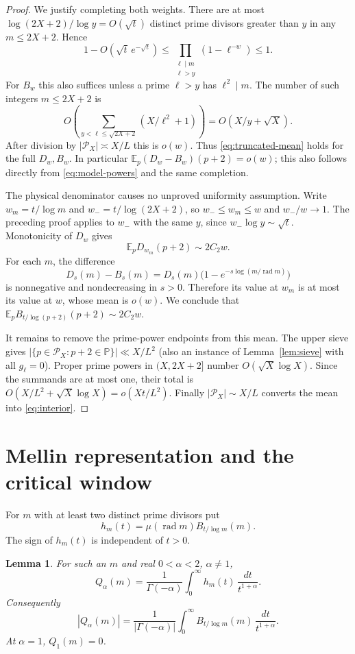 \documentclass[11pt]{article}
\newtheorem{lemma}[theorem]{Lemma}
\theoremstyle{remark}
\newcommand{\PP}{\mathbb P}
\newcommand{\E}{\mathbb E}
\newcommand{\rad}{\operatorname{rad}}
\begin{document}
\begin{proof}
We justify completing both weights. There are at most
$\log(2X+2)/\log y=O(\sqrt t)$ distinct prime divisors greater than
$y$ in any $m\le2X+2$. Hence
\[
 1-O(\sqrt t\,e^{-\sqrt t})
 \le\prod_{\substack{\ell\mid m\\\ell>y}}(1-\ell^{-w})\le1.
\]
For $B_w$ this also suffices unless a prime $\ell>y$ has
$\ell^2\mid m$. The number of such integers $m\le2X+2$ is
\[
 O\left(\sum_{y<\ell\le\sqrt{2X+2}}
                    (X/\ell^2+1)\right)
           =O(X/y+\sqrt X).
\]
After division by $|\mathcal P_X|\asymp X/L$ this is $o(w)$.
Thus \eqref{eq:truncated-mean} holds for the full $D_w,B_w$.
In particular $\E_p(D_w-B_w)(p+2)=o(w)$; this also follows directly
from \eqref{eq:model-powers} and the same completion.

The physical denominator causes no unproved uniformity assumption.
Write $w_m=t/\log m$ and $w_-=t/\log(2X+2)$, so
$w_-\le w_m\le w$ and $w_-/w\to1$. The preceding proof applies to
$w_-$ with the same $y$, since $w_-\log y\sim\sqrt t$.
Monotonicity of $D_w$ gives
\[
 \E_pD_{w_m}(p+2)\sim2C_2w.
\]
For each $m$, the difference
\[
 D_s(m)-B_s(m)=D_s(m)
          \bigl(1-e^{-s\log(m/\rad m)}\bigr)
\]
is nonnegative and nondecreasing in $s>0$. Therefore its value at
$w_m$ is at most its value at $w$, whose mean is $o(w)$.
We conclude that $\E_p B_{t/\log(p+2)}(p+2)\sim2C_2w$.

It remains to remove the prime-power endpoints from this mean.
The upper sieve gives $|\{p\in\mathcal P_X:p+2\in\PP\}|\ll X/L^2$
(also an instance of Lemma~\ref{lem:sieve} with all $g_\ell=0$).
Proper prime powers in $(X,2X+2]$ number $O(\sqrt X\log X)$.
Since the summands are at most one, their total is
$O(X/L^2+\sqrt X\log X)=o(Xt/L^2)$.
Finally $|\mathcal P_X|\sim X/L$ converts the mean into
\eqref{eq:interior}.
\end{proof}

\section{Mellin representation and the critical window}
For $m$ with at least two distinct prime divisors put
\begin{equation}\label{eq:signed-B}
       h_m(t)=\mu(\rad m) B_{t/\log m}(m).
\end{equation}
The sign of $h_m(t)$ is independent of $t>0$.

\begin{lemma}\label{lem:mellin}
For such an $m$ and real $0<\alpha<2$, $\alpha\ne1$,
\begin{equation}\label{eq:mellin}
 Q_\alpha(m)=\frac1{\Gamma(-\alpha)}
                \int_0^\infty h_m(t)\,\frac{dt}{t^{1+\alpha}}.
\end{equation}
Consequently
\[
 |Q_\alpha(m)|=\frac1{|\Gamma(-\alpha)|}
                \int_0^\infty B_{t/\log m}(m)\,\frac{dt}{t^{1+\alpha}}.
\]
At $\alpha=1$, $Q_1(m)=0$.
\end{lemma}
\end{document}
